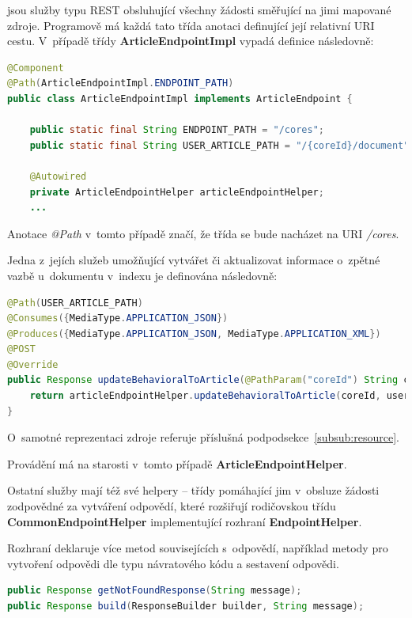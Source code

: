 \documentclass[thesis=M,czech]{FITthesis}[2014/05/07]
\begin{document}
jsou služby typu REST obsluhující všechny žádosti směřující na jimi mapované zdroje. Programově má každá tato třída anotaci definující její relativní URI cestu. V~případě třídy \textbf{ArticleEndpointImpl} vypadá definice následovně:

\begin{lstlisting}[language=java]
@Component
@Path(ArticleEndpointImpl.ENDPOINT_PATH)
public class ArticleEndpointImpl implements ArticleEndpoint {
    
    public static final String ENDPOINT_PATH = "/cores";
    public static final String USER_ARTICLE_PATH = "/{coreId}/document";

    @Autowired
    private ArticleEndpointHelper articleEndpointHelper;  	
    ...
\end{lstlisting}

Anotace \emph{@Path} v~tomto případě značí, že třída se bude nacházet na URI \emph{/cores}.

Jedna z~jejích služeb umožňující vytvářet či aktualizovat informace o~zpětné vazbě u~dokumentu v~indexu je definována následovně:

\begin{lstlisting}[language=java]
@Path(USER_ARTICLE_PATH)
@Consumes({MediaType.APPLICATION_JSON})
@Produces({MediaType.APPLICATION_JSON, MediaType.APPLICATION_XML})
@POST
@Override
public Response updateBehavioralToArticle(@PathParam("coreId") String coreId, UserArticleDocument userArticle) {
    return articleEndpointHelper.updateBehavioralToArticle(coreId, userArticle);
} 
\end{lstlisting}

O~samotné reprezentaci zdroje referuje příslušná podpodsekce~\ref{subsub:resource}.

Provádění má na starosti v~tomto případě \textbf{ArticleEndpointHelper}.

Ostatní služby mají též své helpery – třídy pomáhající jim v~obsluze žádosti zodpovědné za vytváření odpovědí, které rozšiřují rodičovskou třídu \textbf{CommonEndpointHelper} implementující rozhraní \textbf{EndpointHelper}.

Rozhraní deklaruje více metod souvisejících s~odpovědí, například metody pro vytvoření odpovědi dle typu návratového kódu a sestavení odpovědi.

\begin{lstlisting}[language=java]
public Response getNotFoundResponse(String message);
public Response build(ResponseBuilder builder, String message);
\end{lstlisting}
\end{document}
